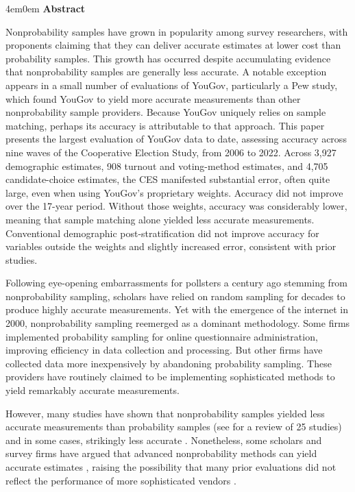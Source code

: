 \documentclass[12pt]{article}
\newenvironment{myabstract}
  {%
    \begin{adjustwidth}{4em}{0em} %
    \noindent\textbf{Abstract}\hspace{1em}%
  }
  {%
    \end{adjustwidth}
    \par
  }
\begin{document}
\begin{myabstract}
Nonprobability samples have grown in popularity among survey researchers, with proponents claiming that they can deliver accurate estimates at lower cost than probability samples. This growth has occurred despite accumulating evidence that nonprobability samples are generally less accurate. A notable exception appears in a small number of evaluations of YouGov, particularly a Pew study, which found YouGov to yield more accurate measurements than other nonprobability sample providers. Because YouGov uniquely relies on sample matching, perhaps its accuracy is attributable to that approach. This paper presents the largest evaluation of YouGov data to date, assessing accuracy across nine waves of the Cooperative Election Study, from 2006 to 2022. Across 3,927 demographic estimates, 908 turnout and voting-method estimates, and 4,705 candidate-choice estimates, the CES manifested substantial error, often quite large, even when using YouGov’s proprietary weights. Accuracy did not improve over the 17-year period. Without those weights, accuracy was considerably lower, meaning that sample matching alone yielded less accurate measurements. Conventional demographic post-stratification did not improve accuracy for variables outside the weights and slightly increased error, consistent with prior studies.

\end{myabstract}

\vspace{1em}


Following eye-opening embarrassments for pollsters a century ago stemming from nonprobability sampling, scholars have relied on random sampling for decades to produce highly accurate measurements. Yet with the emergence of the internet in 2000, nonprobability sampling reemerged as a dominant methodology. Some firms implemented probability sampling for online questionnaire administration, improving efficiency in data collection and processing. But other firms have collected data more inexpensively by abandoning probability sampling. These providers have routinely claimed to be implementing sophisticated methods to yield remarkably accurate measurements.

However, many studies have shown that nonprobability
samples yielded less accurate measurements than probability samples (see \cite{cornesse_review_2020} for a review of 25 studies) and in some cases, strikingly less accurate
\parencite[e.g.,][]{macinnis_accuracy_2018, yeager_comparing_2011}. Nonetheless, some scholars
and survey firms have argued that advanced nonprobability methods can yield
accurate estimates \parencite{ansolabehere_cooperative_2013, crampton_about_2007}, raising the
possibility that many prior evaluations did not reflect the performance of more
sophisticated vendors \parencite[see][]{baker_report_2013}.
\end{document}
